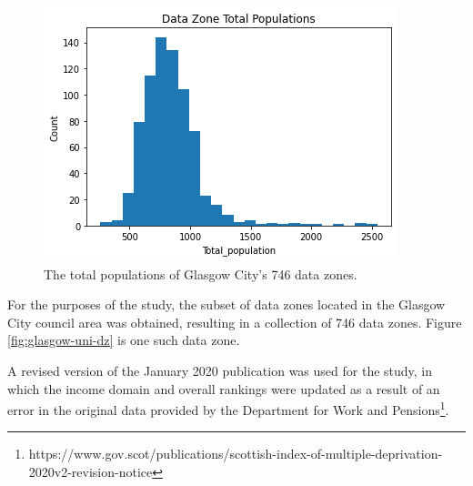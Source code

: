 \documentclass{thesis}
\begin{document}
\begin{figure}[h]
    \centering
    \includegraphics[scale=0.6]{images/dz-total-population.png}
    \caption{The total populations of Glasgow City's 746 data zones.}
    \label{fig:dz-total-populations}
\end{figure}

For the purposes of the study, the subset of data zones located in the Glasgow City council area was obtained, resulting in a collection of 746 data zones. Figure \ref{fig:glasgow-uni-dz} is one such data zone.

A revised version of the January 2020 publication was used for the study, in which the income domain and overall rankings were updated as a result of an error in the original data provided by the Department for Work and Pensions\footnote{https://www.gov.scot/publications/scottish-index-of-multiple-deprivation-2020v2-revision-notice}.
\end{document}
